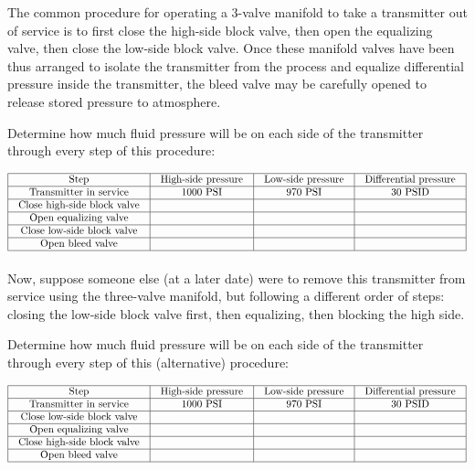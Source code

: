 The common procedure for operating a 3-valve manifold to take a transmitter out of service is to first close the high-side block valve, then open the equalizing valve, then close the low-side block valve.  Once these manifold valves have been thus arranged to isolate the transmitter from the process and equalize differential pressure inside the transmitter, the bleed valve may be carefully opened to release stored pressure to atmosphere.

Determine how much fluid pressure will be on each side of the transmitter through every step of this procedure:


$$\vbox{\offinterlineskip
\halign{\strut
\vrule \quad\hfil # \ \hfil & 
\vrule \quad\hfil # \ \hfil & 
\vrule \quad\hfil # \ \hfil & 
\vrule \quad\hfil # \ \hfil \vrule \cr
\noalign{\hrule}
%
Step & High-side pressure & Low-side pressure & Differential pressure \cr
%
\noalign{\hrule}
%
Transmitter in service & 1000 PSI & 970 PSI & 30 PSID \cr
%
\noalign{\hrule}
%
Close high-side block valve &  &  &  \cr
%
\noalign{\hrule}
%
Open equalizing valve &  &  &  \cr
%
\noalign{\hrule}
%
Close low-side block valve &  &  &  \cr
%
\noalign{\hrule}
%
Open bleed valve &  &  &  \cr
%
\noalign{\hrule}
} %
}$$ %

Now, suppose someone else (at a later date) were to remove this transmitter from service using the three-valve manifold, but following a different order of steps: closing the low-side block valve first, then equalizing, then blocking the high side.

Determine how much fluid pressure will be on each side of the transmitter through every step of this (alternative) procedure:


$$\vbox{\offinterlineskip
\halign{\strut
\vrule \quad\hfil # \ \hfil & 
\vrule \quad\hfil # \ \hfil & 
\vrule \quad\hfil # \ \hfil & 
\vrule \quad\hfil # \ \hfil \vrule \cr
\noalign{\hrule}
%
Step & High-side pressure & Low-side pressure & Differential pressure \cr
%
\noalign{\hrule}
%
Transmitter in service & 1000 PSI & 970 PSI & 30 PSID \cr
%
\noalign{\hrule}
%
Close low-side block valve &  &  &  \cr
%
\noalign{\hrule}
%
Open equalizing valve &  &  &  \cr
%
\noalign{\hrule}
%
Close high-side block valve &  &  &  \cr
%
\noalign{\hrule}
%
Open bleed valve &  &  &  \cr
%
\noalign{\hrule}
} %
}$$ %

